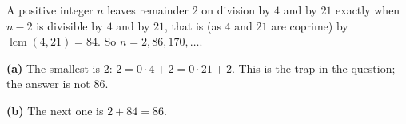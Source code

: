 A positive integer $n$ leaves remainder $2$ on division by $4$ and by $21$ exactly when $n-2$ is divisible by $4$ and by $21$, that is (as $4$ and $21$ are coprime) by $\operatorname{lcm}(4,21)=84$. So $n=2,86,170,\dots$.

\textbf{(a)} The smallest is $\boxed{2}$: $2=0\cdot4+2=0\cdot21+2$. This is the trap in the question; the answer is not $86$.

\textbf{(b)} The next one is $2+84=\boxed{86}$.
